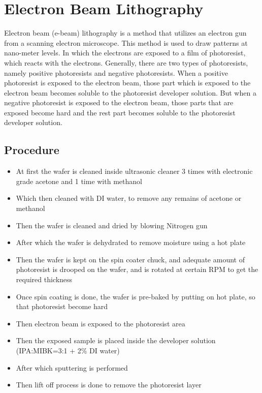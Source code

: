 \documentclass[12pt,a4paper,bold]{thesis}
\theoremstyle{thm}
\theoremstyle{definition}
\begin{document}
\section{Electron Beam Lithography}
Electron beam (e-beam) lithography is a method that utilizes an electron gun from a scanning electron microscope. This method is used to draw patterns at nano-meter levels. In which the electrons are exposed to a film of photoresist, which reacts with the electrons. Generally, there are two types of photoresists, namely positive photoresists and negative photoresists. When a positive photoresist is exposed to the electron beam, those part which is exposed to the electron beam becomes soluble to the photoresist developer solution. But when a negative photoresist is exposed to the electron beam, those parts that are exposed become hard and the rest part becomes soluble to the photoresist developer solution.
\subsection{Procedure}
\begin{itemize}
	\item At first the wafer is cleaned inside ultrasonic cleaner 3 times with electronic grade acetone and 1 time with methanol
	\item Which then cleaned with DI water, to remove any remains of acetone or methanol
	\item Then the wafer is cleaned and dried by blowing Nitrogen gun
	\item After which the wafer is dehydrated to remove moisture using a hot plate
	\item Then the wafer is kept on the spin coater chuck, and adequate amount of photoresist is drooped on the wafer, and is rotated at certain RPM to get the required thickness
	\item Once spin coating is done, the wafer is pre-baked by putting on hot plate, so that photoresist become hard
	\item Then electron beam is exposed to the photoresist area
	\item Then the exposed sample is placed inside the developer solution (IPA:MIBK=3:1 + 2\% DI water)
	\item After which sputtering is performed
	\item Then lift off process is done to remove the photoresist layer 
	
\end{itemize}    
\end{document}
